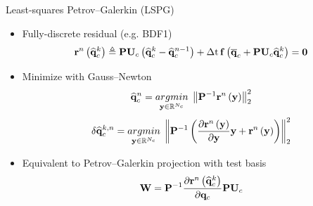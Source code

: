 \documentclass[]{beamer}
\begin{document}
\begin{frame}{Least-squares Petrov--Galerkin (LSPG)}
    \begin{itemize}
		\item Fully-discrete residual (e.g. BDF1)
		\begin{equation*}
			\resFuncIter{\timeIdx}{\consVecCoef^{\newtonIdx}} \triangleq \consScale \consTrial \left( \consVecCoef^{\newtonIdx} - \consVecCoef^{\timeIdx-1} \right) + \dt \, \rhsFunc{\consVecCent + \consScale \consTrial \consVecCoef^{\newtonIdx}} = \zeroVec
		\end{equation*}
		\item Minimize with Gauss--Newton
		\begin{equation*}
			\consVecCoef^{\timeIdx} = \argmin{\dummyVec \in \mathbb{R}^{\numConsvModes}} \norm{\consScaleInv \resFuncIter{\timeIdx}{\dummyVec}}_2^2
		\end{equation*}
		\begin{equation*}
			\delta \consVecCoef^{\newtonIdx, \timeIdx} = \argmin{\dummyVec \in \mathbb{R}^{\numConsvModes}} \norm{\consScaleInv \left(\pde{\resFuncIter{\timeIdx}{\dummyVec}}{\dummyVec} \dummyVec + \resFuncIter{\timeIdx}{\dummyVec}\right)}_2^2
		\end{equation*}
		\item Equivalent to Petrov--Galerkin projection with test basis
		\begin{equation*}
			\testBasis = \consScaleInv \pde{\resFuncIter{\timeIdx}{\consVecCoef^{\newtonIdx}}}{\consVec} \consScale \consTrial
		\end{equation*}
	\end{itemize}
\end{frame}
\end{document}
